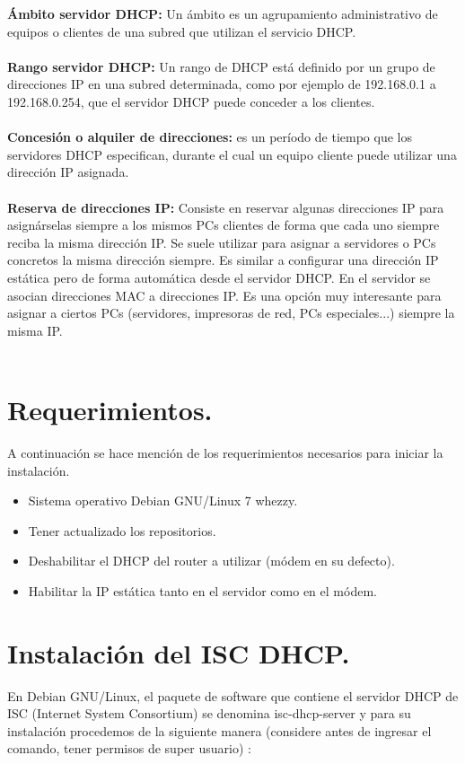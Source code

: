 \textbf{Ámbito servidor DHCP: } Un ámbito es un agrupamiento administrativo de equipos o clientes de una subred que utilizan el servicio DHCP.\\
\\
\textbf{Rango servidor DHCP: } Un rango de DHCP está definido por un grupo de direcciones IP en una subred determinada, como por ejemplo de 192.168.0.1 a 192.168.0.254, que el servidor DHCP puede conceder a los clientes.\\
\\
\textbf{Concesión o alquiler de direcciones: } es un período de tiempo que los servidores DHCP especifican, durante el cual un equipo cliente puede utilizar una dirección IP asignada.\\
\\
\textbf{Reserva de direcciones IP: } Consiste en reservar algunas direcciones IP para asignárselas siempre a los mismos PCs clientes de forma que cada uno siempre reciba la misma dirección IP. Se suele utilizar para asignar a servidores o PCs concretos la misma dirección siempre. Es similar a configurar una dirección IP estática pero de forma automática desde el servidor DHCP. En el servidor se asocian direcciones MAC a direcciones IP. Es una opción muy interesante para asignar a ciertos PCs (servidores, impresoras de red, PCs especiales...) siempre la misma IP.\\
\\


\section{Requerimientos.}
	A continuación se hace mención de los requerimientos necesarios para iniciar la instalación.
	\begin{itemize}
		\item Sistema operativo Debian GNU/Linux 7 whezzy.
		\item Tener actualizado los repositorios.
		\item Deshabilitar el DHCP del router a utilizar (módem en su defecto).
		\item Habilitar la IP estática tanto en el servidor como en el módem.
	\end{itemize}		
	
	
\section{Instalación del ISC DHCP.}
En Debian GNU/Linux, el paquete de software que contiene el servidor DHCP de ISC (Internet System Consortium) se denomina isc-dhcp-server y para su instalación procedemos de la siguiente manera (considere antes de ingresar el comando, tener permisos de super usuario)  :
	
